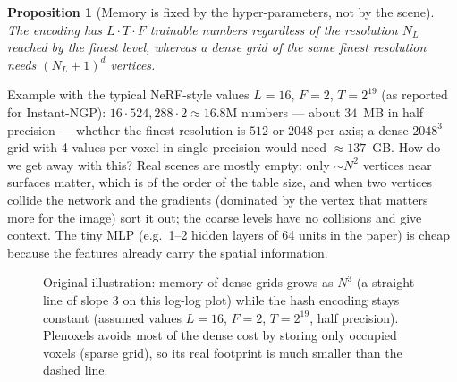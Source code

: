 \documentclass[11pt,a4paper]{article}
\theoremstyle{definition}
\theoremstyle{plain}
\newtheorem{proposition}{Proposition}[section]
\begin{document}
\begin{proposition}[Memory is fixed by the hyper-parameters, not by the scene]\label{prop:hashmem}
The encoding has $L\cdot T\cdot F$ trainable numbers regardless of the resolution $N_L$ reached by the finest level, whereas a dense grid of the same finest resolution needs $(N_L+1)^d$ vertices.
\end{proposition}
\begin{intuition}
Example with the typical NeRF-style values $L=16$, $F=2$, $T=2^{19}$ (as reported for Instant-NGP): $16\cdot524{,}288\cdot2\approx16.8$M numbers --- about $34$~MB in half precision --- whether the finest resolution is $512$ or $2048$ per axis; a dense $2048^3$ grid with 4 values per voxel in single precision would need $\approx137$~GB. How do we get away with this? Real scenes are mostly empty: only $\sim N^2$ vertices near surfaces matter, which is of the order of the table size, and when two vertices collide the network and the gradients (dominated by the vertex that matters more for the image) sort it out; the coarse levels have no collisions and give context. The tiny MLP (e.g.\ 1--2 hidden layers of 64 units in the paper) is cheap because the features already carry the spatial information.
\end{intuition}

\begin{figure}[H]
\centering
{}
\caption{Original illustration: memory of dense grids grows as $N^3$ (a straight line of slope 3 on this log-log plot) while the hash encoding stays constant (assumed values $L=16$, $F=2$, $T=2^{19}$, half precision). Plenoxels avoids most of the dense cost by storing only occupied voxels (sparse grid), so its real footprint is much smaller than the dashed line.}
\end{figure}
\end{document}
